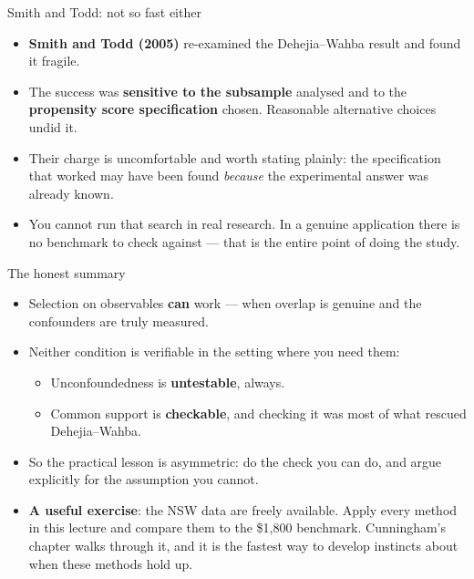 \documentclass[
  11pt,
  ignorenonframetext,
  aspectratio=169,
]{beamer}
\providecommand{\tightlist}{%
  \setlength{\itemsep}{0pt}\setlength{\parskip}{0pt}}
\begin{document}
\begin{frame}{Smith and Todd: not so fast either}
\protect{}\label{smith-and-todd-not-so-fast-either}
\begin{itemize}
\tightlist
\item
  \textbf{Smith and Todd (2005)} re-examined the Dehejia--Wahba result
  and found it fragile.
\item
  The success was \textbf{sensitive to the subsample} analysed and to
  the \textbf{propensity score specification} chosen. Reasonable
  alternative choices undid it.
\item
  Their charge is uncomfortable and worth stating plainly: the
  specification that worked may have been found \emph{because} the
  experimental answer was already known.
\item
  You cannot run that search in real research. In a genuine application
  there is no benchmark to check against --- that is the entire point of
  doing the study.
\end{itemize}
\end{frame}

\begin{frame}{The honest summary}
\protect{}\label{the-honest-summary}
\begin{itemize}
\tightlist
\item
  Selection on observables \textbf{can} work --- when overlap is genuine
  and the confounders are truly measured.
\item
  Neither condition is verifiable in the setting where you need them:

  \begin{itemize}
  \tightlist
  \item
    Unconfoundedness is \textbf{untestable}, always.
  \item
    Common support is \textbf{checkable}, and checking it was most of
    what rescued Dehejia--Wahba.
  \end{itemize}
\item
  So the practical lesson is asymmetric: do the check you can do, and
  argue explicitly for the assumption you cannot.
\item
  \textbf{A useful exercise}: the NSW data are freely available. Apply
  every method in this lecture and compare them to the \$1,800
  benchmark. Cunningham's chapter walks through it, and it is the
  fastest way to develop instincts about when these methods hold up.
\end{itemize}
\end{frame}
\end{document}
